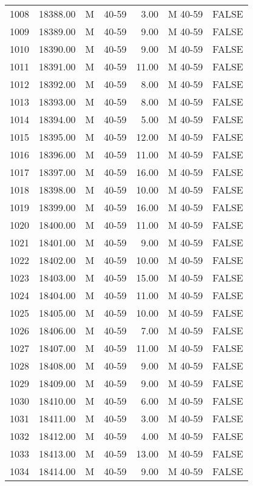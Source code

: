 \begin{table}[ht]
\begin{tabular}{rrllrll}
  1008 & 18388.00 & M & 40-59 & 3.00 & M 40-59 & FALSE \\ 
  1009 & 18389.00 & M & 40-59 & 9.00 & M 40-59 & FALSE \\ 
  1010 & 18390.00 & M & 40-59 & 9.00 & M 40-59 & FALSE \\ 
  1011 & 18391.00 & M & 40-59 & 11.00 & M 40-59 & FALSE \\ 
  1012 & 18392.00 & M & 40-59 & 8.00 & M 40-59 & FALSE \\ 
  1013 & 18393.00 & M & 40-59 & 8.00 & M 40-59 & FALSE \\ 
  1014 & 18394.00 & M & 40-59 & 5.00 & M 40-59 & FALSE \\ 
  1015 & 18395.00 & M & 40-59 & 12.00 & M 40-59 & FALSE \\ 
  1016 & 18396.00 & M & 40-59 & 11.00 & M 40-59 & FALSE \\ 
  1017 & 18397.00 & M & 40-59 & 16.00 & M 40-59 & FALSE \\ 
  1018 & 18398.00 & M & 40-59 & 10.00 & M 40-59 & FALSE \\ 
  1019 & 18399.00 & M & 40-59 & 16.00 & M 40-59 & FALSE \\ 
  1020 & 18400.00 & M & 40-59 & 11.00 & M 40-59 & FALSE \\ 
  1021 & 18401.00 & M & 40-59 & 9.00 & M 40-59 & FALSE \\ 
  1022 & 18402.00 & M & 40-59 & 10.00 & M 40-59 & FALSE \\ 
  1023 & 18403.00 & M & 40-59 & 15.00 & M 40-59 & FALSE \\ 
  1024 & 18404.00 & M & 40-59 & 11.00 & M 40-59 & FALSE \\ 
  1025 & 18405.00 & M & 40-59 & 10.00 & M 40-59 & FALSE \\ 
  1026 & 18406.00 & M & 40-59 & 7.00 & M 40-59 & FALSE \\ 
  1027 & 18407.00 & M & 40-59 & 11.00 & M 40-59 & FALSE \\ 
  1028 & 18408.00 & M & 40-59 & 9.00 & M 40-59 & FALSE \\ 
  1029 & 18409.00 & M & 40-59 & 9.00 & M 40-59 & FALSE \\ 
  1030 & 18410.00 & M & 40-59 & 6.00 & M 40-59 & FALSE \\ 
  1031 & 18411.00 & M & 40-59 & 3.00 & M 40-59 & FALSE \\ 
  1032 & 18412.00 & M & 40-59 & 4.00 & M 40-59 & FALSE \\ 
  1033 & 18413.00 & M & 40-59 & 13.00 & M 40-59 & FALSE \\ 
  1034 & 18414.00 & M & 40-59 & 9.00 & M 40-59 & FALSE \\ 

\end{tabular}
\end{table}
